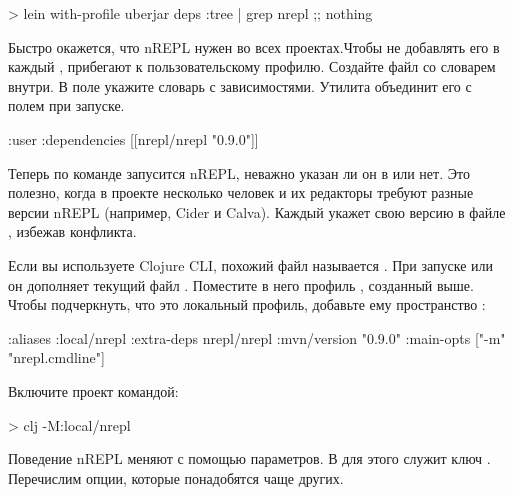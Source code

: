 \begin{english}
  \begin{bash}
> lein with-profile uberjar deps :tree | grep nrepl
;; nothing
  \end{bash}
\end{english}

Быстро окажется, что nREPL нужен во всех проектах.Чтобы не добавлять его в каждый , прибегают к пользовательскому профилю. Создайте файл  со словарем внутри. В поле  укажите словарь с зависимостями. Утилита  объединит его с полем  при запуске.

\begin{english}
  \begin{clojure}
{:user {:dependencies [[nrepl/nrepl "0.9.0"]]}}
  \end{clojure}
\end{english}

Теперь по команде  запусится nREPL, неважно указан ли он в  или нет. Это полезно, когда в проекте несколько человек и их редакторы требуют разные версии nREPL (например, Cider и Calva). Каждый укажет свою версию в файле , избежав конфликта.

Если вы используете Clojure CLI, похожий файл называется . При запуске  или  он дополняет текущий файл . Поместите в него профиль , созданный выше. Чтобы подчеркнуть, что это локальный профиль, добавьте ему пространство :

\begin{english}
  \begin{clojure}
{:aliases
 {:local/nrepl
  {:extra-deps {nrepl/nrepl {:mvn/version "0.9.0"}}
   :main-opts ["-m" "nrepl.cmdline"]}}}
  \end{clojure}
\end{english}

Включите проект командой:

\begin{english}
  \begin{bash}
> clj -M:local/nrepl
  \end{bash}
\end{english}

Поведение nREPL меняют с помощью параметров. В  для этого служит ключ . Перечислим опции, которые понадобятся чаще других.

